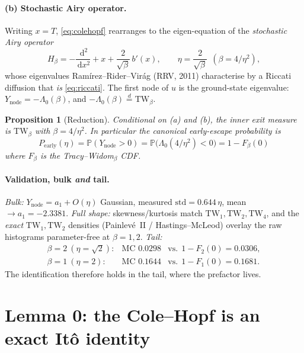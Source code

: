 \documentclass[11pt]{article}
\newtheorem{proposition}{Proposition}
\theoremstyle{remark}
\newcommand{\dd}{\,\mathrm{d}}
\newcommand{\Ynode}{Y_{\mathrm{node}}}
\newcommand{\TW}{\mathrm{TW}}
\newcommand{\Pearly}{P_{\mathrm{early}}}
\newcommand{\eqd}{\stackrel{d}{=}}
\begin{document}
\paragraph{(b) Stochastic Airy operator.} Writing $x=T$, \eqref{eq:colehopf}
rearranges to the eigen-equation of the \emph{stochastic Airy operator}
\begin{equation}\label{eq:sao}
  H_\beta = -\frac{\dd^2}{\dd x^2} + x + \frac{2}{\sqrt\beta}\,b'(x),
  \qquad \eta=\frac{2}{\sqrt\beta}\ \ (\beta=4/\eta^2),
\end{equation}
whose eigenvalues Ram\'irez--Rider--Vir\'ag (RRV, 2011) characterise by a Riccati
diffusion that \emph{is} \eqref{eq:riccati}. The first node of $u$ is the ground-state
eigenvalue: $\Ynode=-\Lambda_0(\beta)$, and $-\Lambda_0(\beta)\eqd\TW_\beta$.

\begin{proposition}[Reduction]\label{prop:reduction}
Conditional on (a) and (b), the inner exit measure is $\TW_\beta$ with $\beta=4/\eta^2$.
In particular the canonical early-escape probability is
\begin{equation}\label{eq:Pearly}
  \boxed{\;\Pearly(\eta)=\mathbb P(\Ynode>0)=\mathbb P\bigl(\Lambda_0(4/\eta^2)<0\bigr)=1-F_\beta(0)\;}
\end{equation}
where $F_\beta$ is the Tracy--Widom$_\beta$ CDF.
\end{proposition}

\paragraph{Validation, bulk \emph{and} tail.}
\emph{Bulk:} $\Ynode=a_1+O(\eta)$ Gaussian, measured $\mathrm{std}=0.644\,\eta$, mean
$\to a_1=-2.3381$. \emph{Full shape:} skewness/kurtosis match $\TW_1,\TW_2,\TW_4$, and
the \emph{exact} $\TW_1,\TW_2$ densities (Painlev\'e~II / Hastings--McLeod) overlay
the raw histograms parameter-free at $\beta=1,2$. \emph{Tail:}
\[
  \begin{array}{lll}
   \beta=2\ (\eta=\sqrt2): & \text{MC }0.0298 & \text{vs.}\ \ 1-F_2(0)=0.0306,\\
   \beta=1\ (\eta=2):      & \text{MC }0.1644 & \text{vs.}\ \ 1-F_1(0)=0.1681.
  \end{array}
\]
The identification therefore holds in the tail, where the prefactor lives.

\section{Lemma 0: the Cole--Hopf is an exact It\^o identity}\label{sec:ito}
\end{document}
